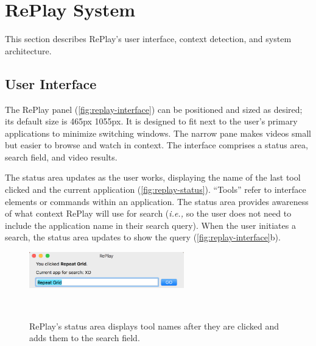 \section{RePlay System}
This section describes RePlay's user interface, context detection, and system architecture.

\subsection{User Interface}
The RePlay panel (\autoref{fig:replay-interface}) can be positioned and sized as desired; its default size is 465px \texttimes 1055px. It is designed to fit next to the user's primary applications to minimize switching windows. The narrow pane makes videos small but easier to browse and watch in context. The interface comprises a status area, search field, and video results.

The status area updates as the user works, displaying the name of the last tool clicked and the current application (\autoref{fig:replay-status}). ``Tools'' refer to interface elements or commands within an application. The status area provides awareness of what context RePlay will use for search (\textit{i.e.,} so the user does not need to include the application name in their search query). When the user initiates a search, the status area updates to show the query (\autoref{fig:replay-interface}b).

\begin{figure}[b!]
\centering
  \includegraphics[width=0.6\textwidth]{replay/figures/replay_status.png}
  \caption{RePlay's status area displays tool names after they are clicked and adds them to the search field. }~\label{fig:replay-status}
\end{figure}

